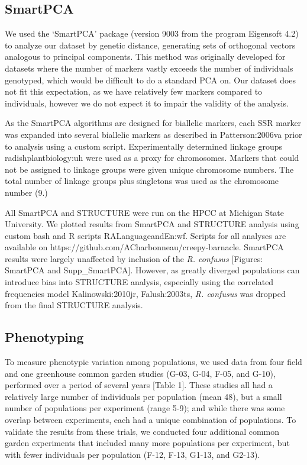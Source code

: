 \documentclass[twocolumn]{bmcart}%
\begin{document}
\subsection*{SmartPCA}

We used the ‘SmartPCA’ package (version 9003 from the program Eigensoft 4.2) to analyze our dataset by genetic distance, generating sets of orthogonal vectors analogous to principal components. This method was originally developed for datasets where the number of markers vastly exceeds the number of individuals genotyped, which would be difficult to do a standard PCA on. Our dataset does not fit this expectation, as we have relatively few markers compared to individuals, however we do not expect it to impair the validity of the analysis.

As the SmartPCA algorithms are designed for biallelic markers, each SSR marker was expanded into several biallelic markers as described in {Patterson:2006va} prior to analysis using a custom script. Experimentally determined linkage groups {radishplantbiology:uh} were used as a proxy for chromosomes. Markers that could not be assigned to linkage groups were given unique chromosome numbers. The total number of linkage groups plus singletons was used as the chromosome number (9.)

All SmartPCA and STRUCTURE were run on the HPCC at Michigan State University. We plotted results from SmartPCA and STRUCTURE analysis using custom bash and R scripts {RALanguageandEn:wf}. Scripts for all analyses are available on {https://github.com/ACharbonneau/creepy-barnacle}. SmartPCA results were largely unaffected by inclusion of the \textit{R. confusus} [Figures: SmartPCA and Supp\_SmartPCA]. However, as greatly diverged populations can introduce bias into STRUCTURE analysis, especially using the correlated frequencies model {Kalinowski:2010jr, Falush:2003ts}, \textit{R. confusus} was dropped from the final STRUCTURE analysis.

\subsection*{Phenotyping}

To measure phenotypic variation among populations, we used data from four field and one greenhouse common garden studies (G-03, G-04, F-05, and G-10), performed over a period of several years [Table 1]. These studies all had a relatively large number of individuals per population (mean 48), but a small number of populations per experiment (range 5-9); and while there was some overlap between experiments, each had a unique combination of populations. To validate the results from these trials, we conducted four additional common garden experiments that included many more populations per experiment, but with fewer individuals per population (F-12, F-13, G1-13, and G2-13).
\end{document}
